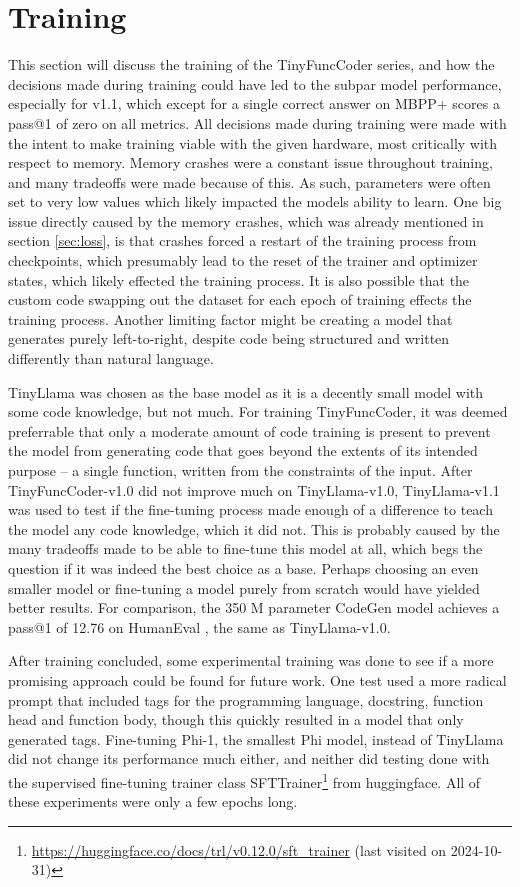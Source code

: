 \section{Training}
\label{sec:trainingdisc}
This section will discuss the training of the TinyFuncCoder series, and how the decisions made during training could have led to the subpar model performance, especially for v1.1, which except for a single correct answer on MBPP+ scores a pass@1 of zero on all metrics.
All decisions made during training were made with the intent to make training viable with the given hardware, most critically with respect to memory.
Memory crashes were a constant issue throughout training, and many tradeoffs were made because of this.
As such, parameters were often set to very low values which likely impacted the models ability to learn.
One big issue directly caused by the memory crashes, which was already mentioned in section \ref{sec:loss}, is that crashes forced a restart of the training process from checkpoints, which presumably lead to the reset of the trainer and optimizer states, which likely effected the training process.
It is also possible that the custom code swapping out the dataset for each epoch of training effects the training process.
Another limiting factor might be creating a model that generates purely left-to-right, despite code being structured and written differently than natural language.

TinyLlama was chosen as the base model as it is a decently small model with some code knowledge, but not much.
For training TinyFuncCoder, it was deemed preferrable that only a moderate amount of code training is present to prevent the model from generating code that goes beyond the extents of its intended purpose -- a single function, written from the constraints of the input.
After TinyFuncCoder-v1.0 did not improve much on TinyLlama-v1.0, TinyLlama-v1.1 was used to test if the fine-tuning process made enough of a difference to teach the model any code knowledge, which it did not.
This is probably caused by the many tradeoffs made to be able to fine-tune this model at all, which begs the question if it was indeed the best choice as a base.
Perhaps choosing an even smaller model or fine-tuning a model purely from scratch would have yielded better results.
For comparison, the 350 M parameter CodeGen model achieves a pass@1 of 12.76 on HumanEval \cite{Nijkamp.2022}, the same as TinyLlama-v1.0.

After training concluded, some experimental training was done to see if a more promising approach could be found for future work.
One test used a more radical prompt that included tags for the programming language, docstring, function head and function body, though this quickly resulted in a model that only generated tags.
Fine-tuning Phi-1, the smallest Phi model, instead of TinyLlama did not change its performance much either, and neither did testing done with the supervised fine-tuning trainer class SFTTrainer\footnote{\url{https://huggingface.co/docs/trl/v0.12.0/sft_trainer} (last visited on 2024-10-31)} from huggingface.
All of these experiments were only a few epochs long.

